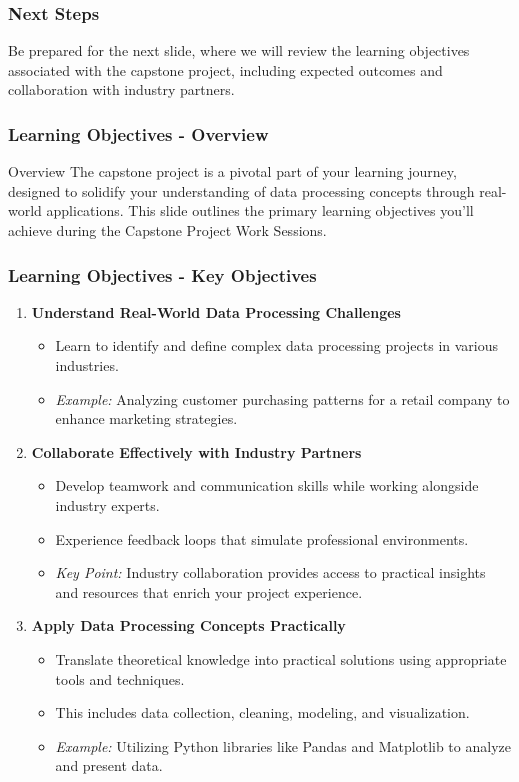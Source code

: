 \documentclass{beamer}
\begin{document}
\begin{frame}[fragile]
    \frametitle{Next Steps}
    Be prepared for the next slide, where we will review the learning objectives associated with the capstone project, including expected outcomes and collaboration with industry partners.
\end{frame}

\begin{frame}[fragile]
    \frametitle{Learning Objectives - Overview}
    \begin{block}{Overview}
        The capstone project is a pivotal part of your learning journey, designed to solidify your understanding of data processing concepts through real-world applications. This slide outlines the primary learning objectives you'll achieve during the Capstone Project Work Sessions.
    \end{block}
\end{frame}

\begin{frame}[fragile]
    \frametitle{Learning Objectives - Key Objectives}
    \begin{enumerate}
        \item \textbf{Understand Real-World Data Processing Challenges}
            \begin{itemize}
                \item Learn to identify and define complex data processing projects in various industries.
                \item \textit{Example:} Analyzing customer purchasing patterns for a retail company to enhance marketing strategies.
            \end{itemize}
        \item \textbf{Collaborate Effectively with Industry Partners}
            \begin{itemize}
                \item Develop teamwork and communication skills while working alongside industry experts.
                \item Experience feedback loops that simulate professional environments.
                \item \textit{Key Point:} Industry collaboration provides access to practical insights and resources that enrich your project experience.
            \end{itemize}
        \item \textbf{Apply Data Processing Concepts Practically}
            \begin{itemize}
                \item Translate theoretical knowledge into practical solutions using appropriate tools and techniques.
                \item This includes data collection, cleaning, modeling, and visualization.
                \item \textit{Example:} Utilizing Python libraries like Pandas and Matplotlib to analyze and present data.
            \end{itemize}
    \end{enumerate}
\end{frame}
\end{document}
